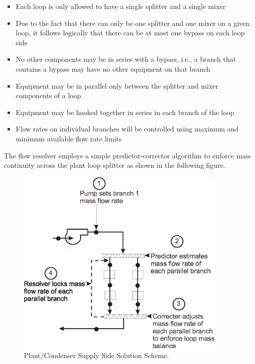 \begin{itemize}
\item
  Each loop is only allowed to have a single splitter and a single mixer
\item
  Due to the fact that there can only be one splitter and one mixer on a given loop, it follows logically that there can be at most one bypass on each loop side
\item
  No other components may be in series with a bypass, i.e., a branch that contains a bypass may have no other equipment on that branch
\item
  Equipment may be in parallel only between the splitter and mixer components of a loop
\item
  Equipment may be hooked together in series in each branch of the loop
\item
  Flow rates on individual branches will be controlled using maximum and minimum available flow rate limits
\end{itemize}

The flow resolver employs a simple predictor-corrector algorithm to enforce mass continuity across the plant loop splitter as shown in the following figure.

\begin{figure}[hbtp] %
\centering
\includegraphics[width=0.9\textwidth, height=0.9\textheight, keepaspectratio=true]{media/image1959.png}
\caption{Plant/Condenser Supply Side Solution Scheme. \protect \label{fig:plantcondenser-supply-side-solution-scheme.}}
\end{figure}

